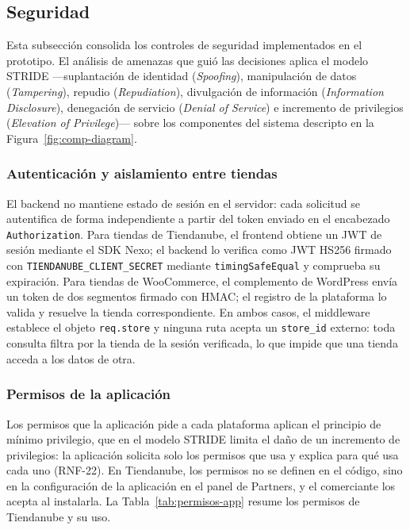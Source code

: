\subsection{Seguridad}
\label{sec:seguridad}

Esta subsección consolida los controles de seguridad implementados en el prototipo. El análisis de amenazas que guió las decisiones aplica el modelo STRIDE ---suplantación de identidad (\emph{Spoofing}), manipulación de datos (\emph{Tampering}), repudio (\emph{Repudiation}), divulgación de información (\emph{Information Disclosure}), denegación de servicio (\emph{Denial of Service}) e incremento de privilegios (\emph{Elevation of Privilege})--- sobre los componentes del sistema descripto en la Figura~\ref{fig:comp-diagram}.

\subsubsection{Autenticación y aislamiento entre tiendas}
\label{sec:autenticacion}

El backend no mantiene estado de sesión en el servidor: cada solicitud se autentifica de forma independiente a partir del token enviado en el encabezado \texttt{Authorization}. Para tiendas de Tiendanube, el frontend obtiene un JWT de sesión mediante el SDK Nexo; el backend lo verifica como JWT HS256 firmado con \texttt{TIENDANUBE\_CLIENT\_SECRET} mediante \texttt{timingSafeEqual} y comprueba su expiración. Para tiendas de WooCommerce, el complemento de WordPress envía un token de dos segmentos firmado con HMAC; el registro de la plataforma lo valida y resuelve la tienda correspondiente. En ambos casos, el middleware establece el objeto \texttt{req.store} y ninguna ruta acepta un \texttt{store\_id} externo: toda consulta filtra por la tienda de la sesión verificada, lo que impide que una tienda acceda a los datos de otra.

\subsubsection{Permisos de la aplicación}
\label{sec:permisos-app}

Los permisos que la aplicación pide a cada plataforma aplican el principio de mínimo privilegio, que en el modelo STRIDE limita el daño de un incremento de privilegios: la aplicación solicita solo los permisos que usa y explica para qué usa cada uno (RNF-22). En Tiendanube, los permisos no se definen en el código, sino en la configuración de la aplicación en el panel de Partners, y el comerciante los acepta al instalarla. La Tabla~\ref{tab:permisos-app} resume los permisos de Tiendanube y su uso.

